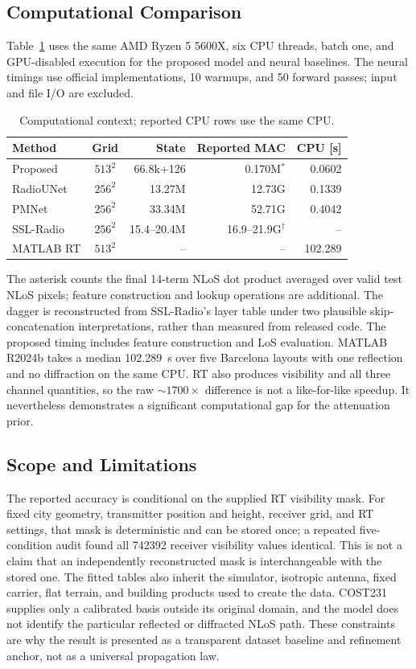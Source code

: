 \documentclass[10pt,conference,letterpaper]{IEEEtran}
\begin{document}
\subsection{Computational Comparison}
Table~\ref{tab:compute} uses the same AMD Ryzen 5 5600X, six CPU threads, batch
one, and GPU-disabled execution for the proposed model and neural baselines.
The neural timings use official implementations, 10 warmups, and 50 forward
passes; input and file I/O are excluded.

\begin{table}[!t]
\centering
\caption{Computational context; reported CPU rows use the same CPU.}
\label{tab:compute}
\scriptsize
\setlength{\tabcolsep}{2.2pt}
\begin{tabular}{@{}lcrrr@{}}
\toprule
Method & Grid & State & Reported MAC & CPU [s] \\
\midrule
Proposed & $513^2$ & 66.8k+126 & 0.170M$^\ast$ & 0.0602 \\
RadioUNet~\cite{radiounet2020} & $256^2$ & 13.27M & 12.73G & 0.1339 \\
PMNet~\cite{pmnet2023} & $256^2$ & 33.34M & 52.71G & 0.4042 \\
SSL-Radio~\cite{sslradio2025} & $256^2$ & 15.4--20.4M & 16.9--21.9G$^\dagger$ & -- \\
MATLAB RT & $513^2$ & -- & -- & 102.289 \\
\bottomrule
\end{tabular}
\end{table}
The asterisk counts the final 14-term NLoS dot product averaged over valid
test NLoS pixels; feature construction and lookup operations are additional.
The dagger is reconstructed from SSL-Radio's layer table under two plausible
skip-concatenation interpretations, rather than measured from released code.
The proposed timing includes feature construction and LoS evaluation. MATLAB
R2024b takes a median \SI{102.289}{s} over five Barcelona layouts with one
reflection and no diffraction on the same CPU. RT also produces visibility
and all three channel quantities, so the raw $\sim1700\times$ difference is
not a like-for-like speedup. It nevertheless demonstrates a significant
computational gap for the attenuation prior.

\subsection{Scope and Limitations}
The reported accuracy is conditional on the supplied RT visibility mask. For
fixed city geometry, transmitter position and height, receiver grid, and RT
settings, that mask is deterministic and can be stored once; a repeated
five-condition audit found all 742392 receiver visibility values identical.
This is not a claim that an independently reconstructed mask is interchangeable
with the stored one. The fitted tables also inherit the simulator, isotropic
antenna, fixed carrier, flat terrain, and building products used to create the
data. COST231 supplies only a calibrated basis outside its original domain,
and the model does not identify the particular reflected or diffracted NLoS
path. These constraints are why the result is presented as a transparent
dataset baseline and refinement anchor, not as a universal propagation law.
\end{document}
